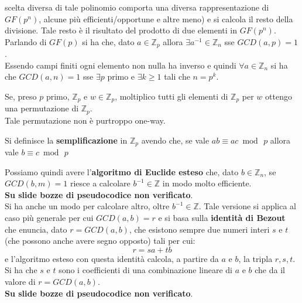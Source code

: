 \documentclass[a4paper,12pt, oneside]{book}
\begin{document}
scelta diversa di tale polinomio comporta una diversa rappresentazione di
$GF(p^n)$, alcune più efficienti/opportune e altre meno) e si calcola il resto
della divisione. Tale resto è il risultato del prodotto di due elementi in
$GF(p^n)$. \\
Parlando di $GF(p)$ si ha che, dato $a\in\mathbb{Z}_p$ allora $\exists
a^{-1}\in\mathbb{Z}_n$ sse $GCD(a,p)=1$.\\
Essendo campi finiti ogni elemento non nulla ha inverso e quindi $\forall
a\in\mathbb{Z}_n$ si ha che $GCD(a,n)=1$ sse $\exists p$ primo e $\exists k\geq
1$ tali che $n=p^k$.
\begin{teorema}
  Se, preso $p$ primo, $\mathbb{Z}_p$ e $w\in\mathbb{Z}_p$, moltiplico tutti gli
  elementi di $\mathbb{Z}_p$ per $w$ ottengo una permutazione di
  $\mathbb{Z}_p$.\\
  Tale permutazione non è purtroppo one-way.
\end{teorema}
\begin{definizione}
  Si definisce la \textbf{semplificazione} in $\mathbb{Z}_p$ avendo che, se vale
  $ab\equiv ac\bmod\,p$ allora vale $b\equiv c\bmod\,p$
\end{definizione}
Possiamo quindi avere l'\textbf{algoritmo di Euclide esteso} che, dato
$b\in \mathbb{Z}_n$, se $GCD(b,m)=1$ riesce a calcolare $b^{-1}\in\mathbb{Z}$ in
modo molto efficiente.\\
\textbf{Su slide bozze di pseudocodice non verificato}.\\
Si ha anche un modo per calcolare altro, oltre $b^{-1}\in\mathbb{Z}$. Tale
versione si applica al caso più generale per cui $GCD(a,b)=r$ e si basa sulla
\textbf{identità di Bezout} che enuncia, dato $r=GCD(a,b)$, che esistono sempre
due numeri interi $s$ e $t$ (che possono anche avere segno opposto) tali per
cui:
\[r=sa+tb\]
e l'algoritmo esteso con questa identità calcola, a partire da $a$ e $b$, la
tripla $r,s,t$.\\
Si ha che $s$ e $t$ sono i coefficienti di una combinazione lineare di $a$ e $b$
che da il valore di $r=GCD(a,b)$.\\
\textbf{Su slide bozze di pseudocodice non verificato}.
\end{document}
